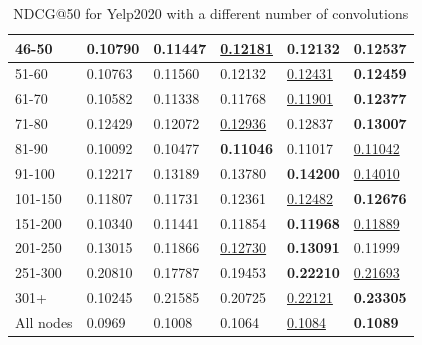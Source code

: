 \begin{table}[]
\begin{tabular}{|l|l|l|l|l|l|}
        46-50     & 0.10790                    & 0.11447                    & \underline{0.12181}        & 0.12132                    & \textbf{0.12537}           \\ \hline
        51-60     & 0.10763                    & 0.11560                    & 0.12132                    & \underline{0.12431}        & \textbf{0.12459}           \\ \hline
        61-70     & 0.10582                    & 0.11338                    & 0.11768                    & \underline{0.11901}        & \textbf{0.12377}           \\ \hline
        71-80     & 0.12429                    & 0.12072                    & \underline{0.12936}        & 0.12837                    & \textbf{0.13007}           \\ \hline
        81-90     & 0.10092                    & 0.10477                    & \textbf{0.11046}           & 0.11017                    & \underline{0.11042}        \\ \hline
        91-100    & 0.12217                    & 0.13189                    & 0.13780                    & \textbf{0.14200}           & \underline{0.14010}        \\ \hline
        101-150   & 0.11807                    & 0.11731                    & 0.12361                    & \underline{0.12482}        & \textbf{0.12676}           \\ \hline
        151-200   & 0.10340                    & 0.11441                    & 0.11854                    & \textbf{0.11968}           & \underline{0.11889}        \\ \hline
        201-250   & 0.13015                    & 0.11866                    & \underline{0.12730}        & \textbf{0.13091}           & 0.11999                    \\ \hline
        251-300   & 0.20810                    & 0.17787                    & 0.19453                    & \textbf{0.22210}           & \underline{0.21693}        \\ \hline
        301+      & 0.10245                    & 0.21585                    & 0.20725                    & \underline{0.22121}        & \textbf{0.23305}           \\ \hline
        All nodes & 0.0969                     & 0.1008                     & 0.1064                     & \underline{0.1084}         & \textbf{0.1089}            \\ \hline
    \end{tabular}
    \caption{NDCG@50 for Yelp2020 with a different number of convolutions}
    \label{tab:yelp2020-con-evaluation}
\end{table}

